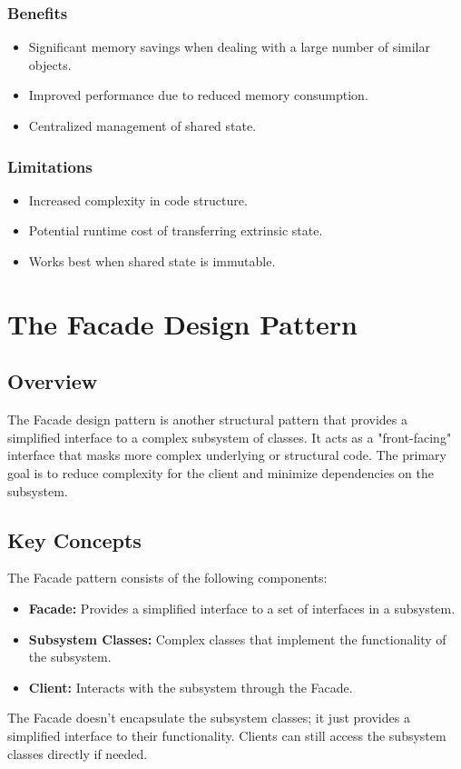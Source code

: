 \documentclass[12pt,a4paper]{article}
\begin{document}
\subsubsection{Benefits}
\begin{itemize}
    \item Significant memory savings when dealing with a large number of similar objects.
    \item Improved performance due to reduced memory consumption.
    \item Centralized management of shared state.
\end{itemize}

\subsubsection{Limitations}
\begin{itemize}
    \item Increased complexity in code structure.
    \item Potential runtime cost of transferring extrinsic state.
    \item Works best when shared state is immutable.
\end{itemize}

\section{The Facade Design Pattern}

\subsection{Overview}
The Facade design pattern is another structural pattern that provides a simplified interface to a complex subsystem of classes. It acts as a "front-facing" interface that masks more complex underlying or structural code. The primary goal is to reduce complexity for the client and minimize dependencies on the subsystem.

\subsection{Key Concepts}
The Facade pattern consists of the following components:
\begin{itemize}
    \item \textbf{Facade:} Provides a simplified interface to a set of interfaces in a subsystem.
    \item \textbf{Subsystem Classes:} Complex classes that implement the functionality of the subsystem.
    \item \textbf{Client:} Interacts with the subsystem through the Facade.
\end{itemize}
The Facade doesn't encapsulate the subsystem classes; it just provides a simplified interface to their functionality. Clients can still access the subsystem classes directly if needed.
\end{document}
